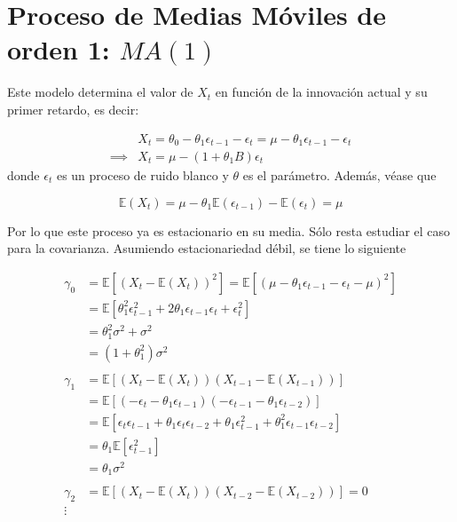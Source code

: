 \documentclass[
  a4paper,
  oneside,
  openany]{book}
\begin{document}
\hypertarget{proceso-de-medias-muxf3viles-de-orden-1-ma1}{%
\section{\texorpdfstring{Proceso de Medias Móviles de orden 1: \(MA(1)\)}{Proceso de Medias Móviles de orden 1: MA(1)}}\label{proceso-de-medias-muxf3viles-de-orden-1-ma1}}

Este modelo determina el valor de \(X_t\) en función de la innovación actual y su primer retardo, es decir:

\[
\begin{split}
& X_t=\theta_0-\theta_1\epsilon_{t-1}-\epsilon_t = \mu-\theta_1\epsilon_{t-1}-\epsilon_t \\
\implies &X_t=\mu-(1+\theta_1 B)\epsilon_{t}
\end{split}
\]
donde \(\epsilon_t\) es un proceso de ruido blanco y \(\theta\) es el parámetro. Además, véase que

\[
\mathbb{E}(X_t) = \mu-\theta_1\mathbb{E}(\epsilon_{t-1})-\mathbb{E}(\epsilon_{t}) = \mu
\]

Por lo que este proceso ya es estacionario en su media. Sólo resta estudiar el caso para la covarianza. Asumiendo estacionariedad débil, se tiene lo siguiente

\[
\begin{split}
\gamma_0 &= \mathbb{E}\left[(X_{t}-\mathbb{E}(X_{t}))^2\right]=\mathbb{E}\left[(\mu-\theta_1\epsilon_{t-1}-\epsilon_t-\mu)^2\right]\\
& = \mathbb{E}\left[\theta_1^2\epsilon_{t-1}^2+2\theta_1\epsilon_{t-1}\epsilon_{t}+\epsilon_t^2\right]\\
& = \theta_1^2\sigma^2+\sigma^2\\
& =(1+\theta_1^2)\sigma^2\\
\\
\gamma_1 &= \mathbb{E}\left[(X_{t}-\mathbb{E}(X_{t}))(X_{t-1}-\mathbb{E}(X_{t-1}))\right]\\
& =\mathbb{E}\left[(-\epsilon_t-\theta_1\epsilon_{t-1})(-\epsilon_{t-1}-\theta_1\epsilon_{t-2})\right]\\
& = \mathbb{E}\left[\epsilon_t\epsilon_{t-1}+\theta_1\epsilon_t\epsilon_{t-2}+\theta_1\epsilon_{t-1}^2+\theta_1^2\epsilon_{t-1}\epsilon_{t-2}\right]\\
& =\theta_1\mathbb{E}\left[\epsilon_{t-1}^2\right]\\
&= \theta_1\sigma^2\\
\\
\gamma_2 &= \mathbb{E}\left[(X_{t}-\mathbb{E}(X_{t}))(X_{t-2}-\mathbb{E}(X_{t-2}))\right] = 0\\
\vdots
\end{split}
\]
\end{document}

